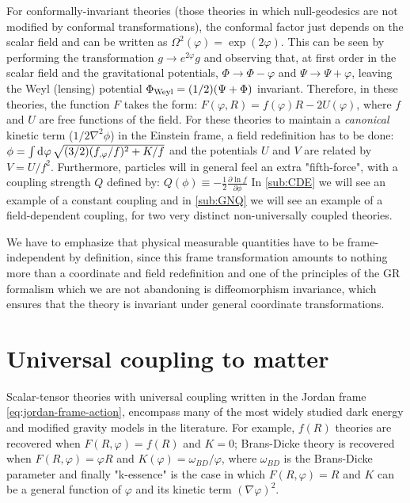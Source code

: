 For conformally-invariant theories (those theories in which null-geodesics are not modified by conformal transformations), the conformal factor
just depends on the scalar field and can be written as $\Omega^2(\varphi)=\exp(2\varphi)$. 
This can be seen by performing the transformation $g \rightarrow e^{2\varphi} g$ and 
observing that, at first order in the
scalar field and the gravitational potentials, $\Phi \rightarrow \Phi-\varphi$ and $\Psi \rightarrow \Psi+\varphi$, leaving 
the Weyl (lensing) potential $\Phi_{\rm Weyl} = (1/2)(\Psi + \Phi)$ invariant.
Therefore, in these theories, the function $F$ takes the form: $F(\varphi, R) = f(\varphi)R-2U(\varphi)$, where
$f$ and $U$ are free functions of the field.
For these theories to maintain a \emph{canonical} kinetic term ($1/2 \nabla^2 \phi$) in the Einstein frame, a field redefinition has to be done:
\beeq$
\phi = \int \mathrm{d}^{} {\varphi} \, \sqrt{(3/2)(f_{,\varphi}/f)^2 + K/f}
$
and the potentials $U$ and $V$ are related by $V = U/f^2$.
Furthermore, particles will in general feel an extra "fifth-force", with a coupling strength $Q$
defined by:
\beeqp$\label{eq:definition-of-coupling-Q}
Q(\phi) \equiv -\frac{1}{2}\frac{\partial \ln f}{\partial \phi}
$
In \cref{sub:CDE} we will see an example of a constant coupling and in \cref{sub:GNQ} we will see an example of a field-dependent coupling, 
for two very distinct non-universally coupled theories.

We have to emphasize that physical measurable quantities have to be frame-independent by definition,
since this frame transformation amounts to nothing more than a coordinate and field redefinition 
and one of the principles of the GR formalism which we are not abandoning
is diffeomorphism invariance, which ensures that 
the theory is invariant under general coordinate transformations.


\section{Universal coupling to matter \label{sec:universal-coupling}}

Scalar-tensor theories with universal coupling written in the Jordan frame \cref{eq:jordan-frame-action}, 
encompass many of the most widely studied dark energy and modified gravity models in the literature. 
For example, $f(R)$ theories \cite{cite, many, f(R), theories} are recovered when $F(R,\varphi) = f(R)$ and $K=0$;
Brans-Dicke theory \cite{cite Brans Dicke, and, many, others} is recovered when $F(R,\varphi) = \varphi R $ and 
$K(\varphi) = \omega_{BD}/\varphi$, where $\omega_{BD}$ is the Brans-Dicke parameter and finally "k-essence" 
\cite{cite, Luca, and, some, kessence} is the case in which $F(R,\varphi) = R$ and $K$ can be a general
function of $\varphi$ and its kinetic term $(\nabla \varphi)^2$. 

